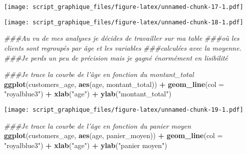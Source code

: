 \documentclass[
]{article}
\newenvironment{Shaded}{\begin{snugshade}}{\end{snugshade}}
\newcommand{\CommentTok}[1]{\textcolor[rgb]{0.56,0.35,0.01}{\textit{#1}}}
\newcommand{\DataTypeTok}[1]{\textcolor[rgb]{0.13,0.29,0.53}{#1}}
\newcommand{\DecValTok}[1]{\textcolor[rgb]{0.00,0.00,0.81}{#1}}
\newcommand{\FloatTok}[1]{\textcolor[rgb]{0.00,0.00,0.81}{#1}}
\newcommand{\KeywordTok}[1]{\textcolor[rgb]{0.13,0.29,0.53}{\textbf{#1}}}
\newcommand{\NormalTok}[1]{#1}
\newcommand{\OperatorTok}[1]{\textcolor[rgb]{0.81,0.36,0.00}{\textbf{#1}}}
\newcommand{\OtherTok}[1]{\textcolor[rgb]{0.56,0.35,0.01}{#1}}
\newcommand{\StringTok}[1]{\textcolor[rgb]{0.31,0.60,0.02}{#1}}
\begin{document}
\texttt{[image: script\_graphique\_files/figure-latex/unnamed-chunk-17-1.pdf]}

\begin{Shaded}
\end{Shaded}

\texttt{[image: script\_graphique\_files/figure-latex/unnamed-chunk-18-1.pdf]}

\begin{Shaded}
\begin{Highlighting}[]
\CommentTok{###Au vu de mes analyses je décides de travailler sur ma table}
\CommentTok{###où les clients sont regroupés par âge et les variables}
\CommentTok{###calculées avec la moyenne.}
\CommentTok{###Je perds un peu de précision mais je gagné énormément en lisibilité}

\CommentTok{###Je trace la courbe de l'âge en fonction du montant_total}
\KeywordTok{ggplot}\NormalTok{(customers_age, }\KeywordTok{aes}\NormalTok{(age, montant_total)) }\OperatorTok{+}
\StringTok{  }\KeywordTok{geom_line}\NormalTok{(}\DataTypeTok{col =} \StringTok{"royalblue3"}\NormalTok{) }\OperatorTok{+}\StringTok{ }\KeywordTok{xlab}\NormalTok{(}\StringTok{"age"}\NormalTok{) }\OperatorTok{+}\StringTok{ }\KeywordTok{ylab}\NormalTok{(}\StringTok{"montant_total"}\NormalTok{)}
\end{Highlighting}
\end{Shaded}

\texttt{[image: script\_graphique\_files/figure-latex/unnamed-chunk-19-1.pdf]}

\begin{Shaded}
\begin{Highlighting}[]
\CommentTok{###Je trace la courbe de l'âge en fonction du panier moyen}
\KeywordTok{ggplot}\NormalTok{(customers_age, }\KeywordTok{aes}\NormalTok{(age, panier_moyen)) }\OperatorTok{+}
\StringTok{  }\KeywordTok{geom_line}\NormalTok{(}\DataTypeTok{col =} \StringTok{"royalblue3"}\NormalTok{) }\OperatorTok{+}\StringTok{ }\KeywordTok{xlab}\NormalTok{(}\StringTok{"age"}\NormalTok{) }\OperatorTok{+}\StringTok{ }\KeywordTok{ylab}\NormalTok{(}\StringTok{"panier moyen"}\NormalTok{)}
\end{Highlighting}
\end{Shaded}
\end{document}
